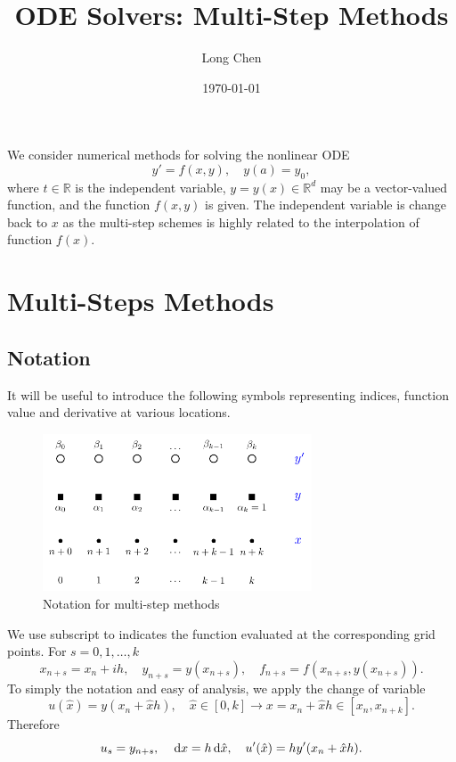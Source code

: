 \documentclass[10pt]{amsart}
\begin{document}
\title{ODE Solvers: Multi-Step Methods}
\author{Long Chen}\date{\today}
\begin{abstract}

\end{abstract}
\maketitle

\tableofcontents

We consider numerical methods for solving the nonlinear ODE  
\begin{equation}\label{ODE}  
y' = f(x, y),\quad y(a) = y_0,  
\end{equation}  
where $t \in \mathbb{R}$ is the independent variable, $y = y(x) \in \mathbb{R}^d$ may be a vector-valued function, and the function $f(x, y)$ is given. The independent variable is change back to $x$ as the multi-step schemes is highly related to the interpolation of function $f(x)$. 

\section{Multi-Steps Methods}

\subsection{Notation}
It will be useful to introduce the following symbols representing indices, function value and derivative at various locations.

\begin{figure}[htbp]
\begin{center}
\includegraphics[width=8cm]{figures/multistep.pdf}
\caption{Notation for multi-step methods}
\label{fig:multistep}
\end{center}
\end{figure}

We use subscript to indicates the function evaluated at the corresponding grid points. For $s =0,1,\ldots, k$
$$
x_{n+s} = x_n + ih, \quad y_{n+s} = y(x_{n+s}), \quad f_{n+s} = f(x_{n+s}, y(x_{n+s})).
$$
To simply the notation and easy of analysis, we apply the change of variable  
$$
u(\hat x) = y(x_{n} + \hat xh), \quad \hat x\in [0,k] \to x = x_n+ \hat x h \in [x_n, x_{n+k}].
$$
Therefore 
\begin{equation}\label{eq:change}
u_s = y_{n+s}, \quad \,{\rm d}x = h \,{\rm d} \hat{x}, \quad u'(\hat x) = h y'(x_{n} + \hat xh).
\end{equation}
\end{document}
